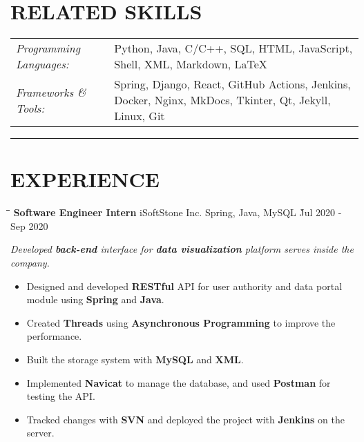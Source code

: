 \documentclass{res}
\begin{document}
\begin{resume}
\vspace{-0.2in}
\section{RELATED SKILLS}  
    \vspace{+0.1in}
    \hspace{-0.12in} 
    \begin{tabular}{l p{4.6in}}
    {\sl Programming Languages:} & Python, Java, C/C++, SQL, HTML, JavaScript, 
                        Shell, XML, Markdown, LaTeX \\ 
    \rule{0in}{0.2in}
    {\sl Frameworks \& Tools:} & Spring, Django, React, GitHub Actions, Jenkins, Docker, Nginx, 
                         MkDocs, Tkinter, Qt, Jekyll, Linux, Git
    \end{tabular}   

\vspace{-5pt}
\hspace{-0.55in}
\noindent\rule[0.25\baselineskip]{19.36cm}{0.5pt}    

\vspace{-0.2in}
\section{EXPERIENCE}
    \vspace{0.00in}	
    \begin{tabbing}
    \hspace{2.6in}\= \hspace{1.5in}\= \hspace{1.6in}\= \kill %
    {\bf Software Engineer Intern} \> iSoftStone Inc. \>  
                                        Spring, Java, MySQL    \` Jul 2020 - Sep 2020\\
    \end{tabbing}\vspace{-20pt}      %
    \vspace{-0.1in}
    \textit{Developed {\bf back-end} interface for {\bf data visualization} 
                platform serves inside the company.}
    \vspace{+0.05in}
    \begin{itemize} \itemsep 1.5pt %
        \item Designed and developed {\bf RESTful} API for user authority and 
                data portal module using {\bf Spring} and {\bf Java}.
        \item Created {\bf Threads} using {\bf Asynchronous Programming} to 
                improve the performance.
        \item Built the storage system with {\bf MySQL} and {\bf XML}.
        \item Implemented {\bf Navicat} to manage the database, and used {\bf Postman} for testing the API.
        \item Tracked changes with {\bf SVN} and deployed the project with {\bf Jenkins} 
                on the server.
    \end{itemize}


\end{resume}
\end{document}
